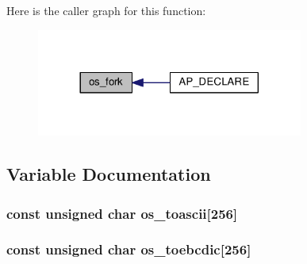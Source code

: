 Here is the caller graph for this function\+:
\nopagebreak
\begin{figure}[H]
\begin{center}
\leavevmode
\includegraphics[width=248pt]{group__APACHE__OS__BS2000_gacbdecddff32aa0ee1be0fd22f50f1371_icgraph}
\end{center}
\end{figure}




\subsection{Variable Documentation}
\subsubsection[{\texorpdfstring{os\+\_\+toascii}{os_toascii}}]{\setlength{\rightskip}{0pt plus 5cm}const unsigned char os\+\_\+toascii\mbox{[}256\mbox{]}}\hypertarget{group__APACHE__OS__BS2000_ga566a3db2a61dc343f4cd0afce831dcf0}{}\label{group__APACHE__OS__BS2000_ga566a3db2a61dc343f4cd0afce831dcf0}
\subsubsection[{\texorpdfstring{os\+\_\+toebcdic}{os_toebcdic}}]{\setlength{\rightskip}{0pt plus 5cm}const unsigned char os\+\_\+toebcdic\mbox{[}256\mbox{]}}\hypertarget{group__APACHE__OS__BS2000_ga91872b84fa65c5adc802593e201d25fb}{}\label{group__APACHE__OS__BS2000_ga91872b84fa65c5adc802593e201d25fb}
